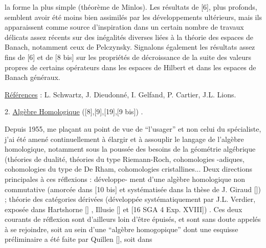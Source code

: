 
la forme la plus simple (théorème de Minlos). Les
résultats de [6], plus profonds, semblent avoir été
moins bien assimilés par les développements ultérieurs,
mais ils apparaissent comme source d'inspiration dans
un certain nombre de travaux délicats assez récents
sur des inégalités diverses liées à la théorie des
espaces de Banach, notamment ceux de Pelczynsky. Signalons
également les résultats assez fins de [6] et de [8 bis]
sur les propriétés de décroissance de la suite des
valeurs propres de certains opérateurs dans les espaces
de Hilbert et dans les espaces de Banach généraux.

\uline{Références} : L. Schwartz, J. Dieudonné, I. Gelfand,
P. Cartier, J.L. Lions.

2. \uline{Algèbre Homologique} ([8],[9],[19],[9 bis]) .

Depuis 1955, me plaçant au point de vue de
``l'usager'' et non celui du spécialiste, j'ai été amené
continuellement à élargir et à assouplir le langage
de l'algèbre homologique, notamment sous la poussée des
besoins de la géométrie algébrique (théories de dualité,
théories du type Riemann-Roch, cohomologies \hand{$\ell$}-adiques,
cohomologies du type de De Rham, cohomologies cristallines...
Deux directions principales à ces réflexions : développe-%
ment d'une algèbre homologique non commutative (amorcée
dans [10 bis] et systématisée dans la thèse de J. Giraud
[\hand{$*$}]) ; théorie des catégories dérivées (développée
systématiquement par J.L. Verdier, exposée dans
Hartshorne [\hand{$*$}] , Illusie [\hand{$*$}] et [16 SGA 4 Exp. XVIII]) .
Ces deux courants de réflexion sont d'ailleurs loin
d'être épuisés, et sont sans doute appelés à se rejoindre,
soit au sein d'une ``algèbre homogopique'' dont une esquisse
préliminaire a été faite par Quillen [\hand{$*$}], soit dans


